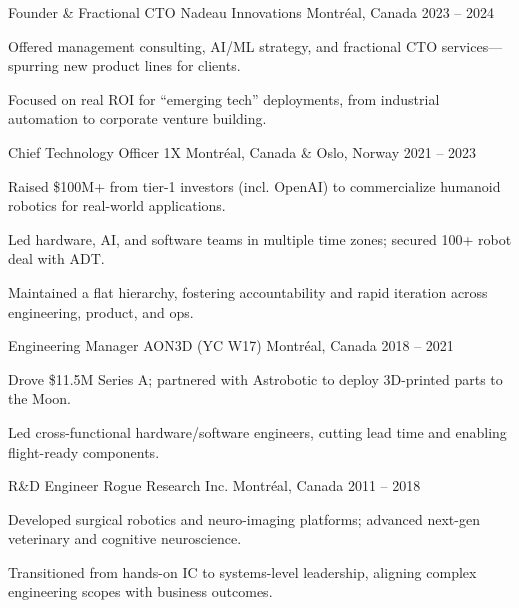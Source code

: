 \documentclass[11pt, letterpaper]{awesome-cv}
\begin{document}
\cventry
    {Founder \& Fractional CTO}
    {Nadeau Innovations}
    {Montréal, Canada}
    {2023 -- 2024}
    {
      \begin{cvitems}
        \item {Offered management consulting, AI/ML strategy, and fractional CTO services—spurring new product lines for clients.}
        \item {Focused on real ROI for “emerging tech” deployments, from industrial automation to corporate venture building.}
      \end{cvitems}
    }

\cventry
    {Chief Technology Officer}
    {1X}
    {Montréal, Canada \& Oslo, Norway}
    {2021 -- 2023}
    {
      \begin{cvitems}
        \item {Raised \$100M+ from tier-1 investors (incl. OpenAI) to commercialize humanoid robotics for real-world applications.}
        \item {Led hardware, AI, and software teams in multiple time zones; secured 100+ robot deal with ADT.}
        \item {Maintained a flat hierarchy, fostering accountability and rapid iteration across engineering, product, and ops.}
      \end{cvitems}
    }

\cventry
    {Engineering Manager}
    {AON3D (YC W17)}
    {Montréal, Canada}
    {2018 -- 2021}
    {
      \begin{cvitems}
        \item {Drove \$11.5M Series A; partnered with Astrobotic to deploy 3D-printed parts to the Moon.}
        \item {Led cross-functional hardware/software engineers, cutting lead time and enabling flight-ready components.}
      \end{cvitems}
    }

\cventry
    {R\&D Engineer}
    {Rogue Research Inc.}
    {Montréal, Canada}
    {2011 -- 2018}
    {
      \begin{cvitems}
        \item {Developed surgical robotics and neuro-imaging platforms; advanced next-gen veterinary and cognitive neuroscience.}
        \item {Transitioned from hands-on IC to systems-level leadership, aligning complex engineering scopes with business outcomes.}
      \end{cvitems}
    }
\end{document}
